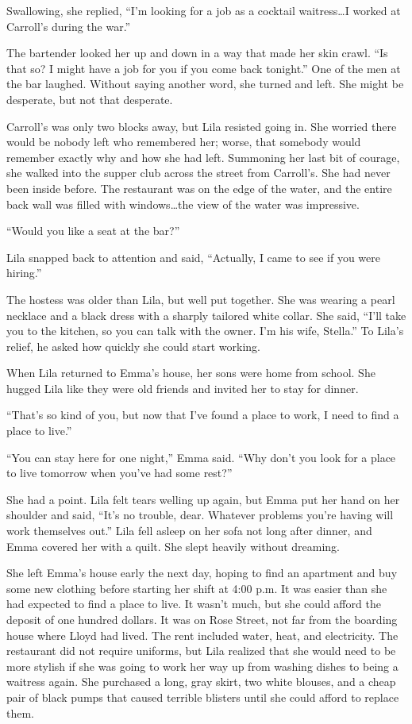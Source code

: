 \documentclass[
  american,
  letterpaper,
]{book}
\begin{document}
Swallowing, she replied, ``I'm looking for a job as a cocktail
waitress\ldots I worked at Carroll's during the war.''

The bartender looked her up and down in a way that made her skin crawl.
``Is that so? I might have a job for you if you come back tonight.'' One
of the men at the bar laughed. Without saying another word, she turned
and left. She might be desperate, but not that desperate.

Carroll's was only two blocks away, but Lila resisted going in. She
worried there would be nobody left who remembered her; worse, that
somebody would remember exactly why and how she had left. Summoning her
last bit of courage, she walked into the supper club across the street
from Carroll's. She had never been inside before. The restaurant was on
the edge of the water, and the entire back wall was filled with
windows\ldots the view of the water was impressive.

``Would you like a seat at the bar?''

Lila snapped back to attention and said, ``Actually, I came to see if
you were hiring.''

The hostess was older than Lila, but well put together. She was wearing
a pearl necklace and a black dress with a sharply tailored white collar.
She said, ``I'll take you to the kitchen, so you can talk with the
owner. I'm his wife, Stella.'' To Lila's relief, he asked how quickly
she could start working.

When Lila returned to Emma's house, her sons were home from school. She
hugged Lila like they were old friends and invited her to stay for
dinner.

``That's so kind of you, but now that I've found a place to work, I need
to find a place to live.''

``You can stay here for one night,'' Emma said. ``Why don't you look for
a place to live tomorrow when you've had some rest?''

She had a point. Lila felt tears welling up again, but Emma put her hand
on her shoulder and said, ``It's no trouble, dear. Whatever problems
you're having will work themselves out.'' Lila fell asleep on her sofa
not long after dinner, and Emma covered her with a quilt. She slept
heavily without dreaming.

She left Emma's house early the next day, hoping to find an apartment
and buy some new clothing before starting her shift at 4:00 p.m. It was
easier than she had expected to find a place to live. It wasn't much,
but she could afford the deposit of one hundred dollars. It was on Rose
Street, not far from the boarding house where Lloyd had lived. The rent
included water, heat, and electricity. The restaurant did not require
uniforms, but Lila realized that she would need to be more stylish if
she was going to work her way up from washing dishes to being a waitress
again. She purchased a long, gray skirt, two white blouses, and a cheap
pair of black pumps that caused terrible blisters until she could afford
to replace them.
\end{document}
